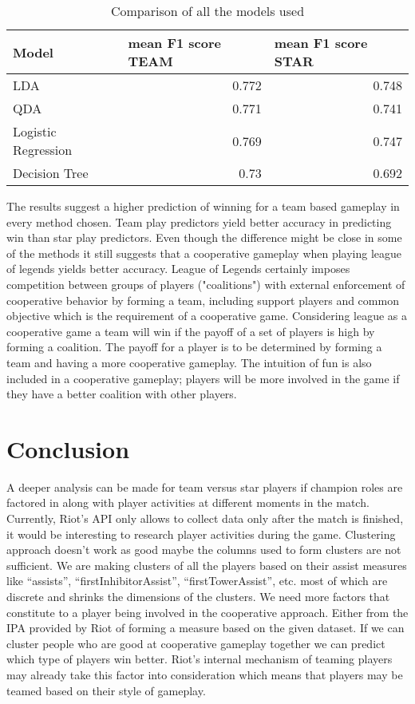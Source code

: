 \documentclass[conference]{IEEEtran}
\begin{document}
\begin{table}[htbp]
  \centering
  \caption{Comparison of all the models used}
    \begin{tabular}{|l|r|r|}
    \toprule
    Model & \multicolumn{1}{l|}{mean F1 score TEAM} & \multicolumn{1}{l|}{mean F1 score STAR} \\
    \midrule
    LDA   & 0.772 & 0.748 \\
    \midrule
    QDA   & 0.771 & 0.741 \\
    \midrule
    Logistic Regression & 0.769 & 0.747 \\
  \midrule
    Decision Tree & 0.73  & 0.692 \\
    \bottomrule
    \end{tabular}%
  \label{tab:addlabel}%
\end{table}%
 


The results suggest a higher prediction of winning for a team based gameplay in every method chosen. Team play predictors yield better accuracy in predicting win than star play predictors. Even though the difference might be close in some of the methods it still suggests that a cooperative gameplay when playing league of legends yields better accuracy. League of Legends certainly imposes competition between groups of players ("coalitions") with external enforcement of cooperative behavior by forming a team, including support players and common objective which is the requirement of a cooperative game. Considering league as a cooperative game a team will win if the payoff of a set of players is high by forming a coalition. The payoff for a player is to be determined by forming a team and having a more cooperative gameplay. The intuition of fun is also included in a cooperative gameplay; players will be more involved in the game if they have a better coalition with other players.

\section{Conclusion}


A deeper analysis can be made for team versus star players if champion roles are factored in along with player activities at different moments in the match. Currently, Riot's API only allows to collect data only after the match is finished, it would be interesting to research player activities during the game. Clustering approach doesn’t work as good maybe the columns used to form clusters are not sufficient. We are making clusters of all the players based on their assist measures like “assists”, “firstInhibitorAssist”, “firstTowerAssist”, etc. most of which are discrete and shrinks the dimensions of the clusters. We need more factors that constitute to a player being involved in the cooperative approach. Either from the IPA provided by Riot of forming a measure based on the given dataset. If we can cluster people who are good at cooperative gameplay together we can predict which type of players win better. Riot’s internal mechanism of teaming players may already take this factor into consideration which means that players may be teamed based on their style of gameplay. 
\end{document}
